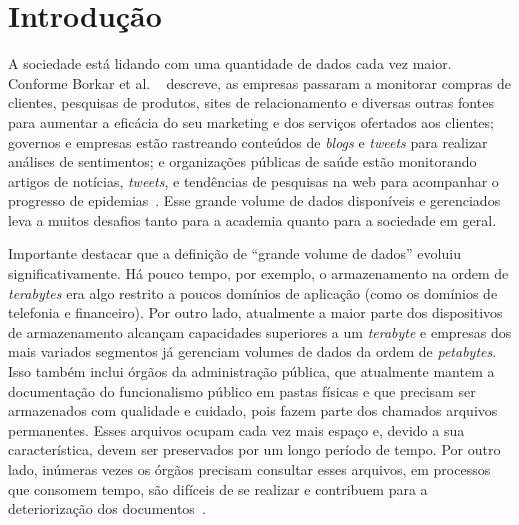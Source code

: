 \chapter{Introdução}
A sociedade está lidando com uma quantidade de dados cada vez maior. 
Conforme Borkar et al. ~\cite{WNextBigData} descreve, as empresas passaram a monitorar compras de clientes, pesquisas de produtos, sites de relacionamento e diversas outras fontes para aumentar a eficácia do seu marketing e dos serviços ofertados aos clientes; governos e empresas estão rastreando conteúdos de \textit{blogs} e \textit{tweets} para realizar análises de sentimentos; e organizações públicas de saúde estão monitorando artigos de notícias, \textit{tweets}, e tendências de pesquisas na web para acompanhar o progresso de epidemias~\cite{WNextBigData}. Esse grande volume de dados disponíveis e gerenciados leva a muitos desafios tanto para a academia quanto para a sociedade em geral.

Importante destacar que a definição de ``grande volume de dados'' evoluiu significativamente. Há pouco tempo, por exemplo, o armazenamento na ordem de \emph{terabytes} era algo restrito a poucos domínios de aplicação (como os domínios de telefonia e financeiro). Por outro lado, atualmente a maior parte dos dispositivos de armazenamento alcançam capacidades superiores a um \emph{terabyte} e  empresas dos mais variados segmentos já gerenciam volumes de dados da ordem de \emph{petabytes}.
Isso também inclui órgãos da administração pública, que atualmente mantem a documentação do funcionalismo público em pastas físicas e que precisam ser armazenados com qualidade e cuidado, pois fazem parte dos chamados arquivos permanentes. Esses arquivos ocupam cada vez mais espaço e, devido a sua característica, devem ser preservados por um longo período de tempo. Por outro lado, inúmeras vezes os órgãos precisam consultar esses arquivos, em processos que consomem tempo, são difíceis de se realizar e contribuem para a deteriorização dos documentos~\cite{arqConarq}.

